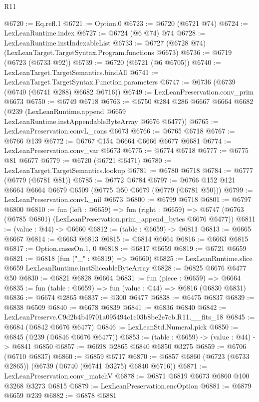 \begin{lexlean}{R11}
\begin{coremodule}
@6720 := Eq.refl.{1}
@6721 := Option.{0}
@6723 := @6720 (@6721 @74)
@6724 := LexLeanRuntime.index
@6727 := @6724 (@6 @74) @74
@6728 := LexLeanRuntime.instIndexableList
@6733 := @6727 (@6728 @74) (LexLeanTarget.TargetSyntax.Program.functions @6673)
@6736 := @6719 (@6723 (@6733 @92))
@6739 := @6720 (@6721 (@6 @6705))
@6740 := LexLeanTarget.TargetSemantics.bindAll
@6741 := LexLeanTarget.TargetSyntax.Function.parameters
@6747 := @6736 (@6739 (@6740 (@6741 @288) @6682 @6716))
@6749 := LexLeanPreservation.conv_prim @6673
@6750 := @6749 @6718
@6763 := @6750
    @284
    @286
    @6667
    @6664
    @6682
    (@239 (LexLeanRuntime.append @6659 LexLeanRuntime.instAppendableByteArray @6676 @6477))
@6765 := LexLeanPreservation.convL_cons @6673
@6766 := @6765 @6718
@6767 := @6766 @139
@6772 := @6767 @154 @6664 @6666 @6677 @6681
@6774 := LexLeanPreservation.conv_var @6673
@6775 := @6774 @6718
@6777 := @6775 @81 @6677
@6779 := @6720 (@6721 @6471)
@6780 := LexLeanTarget.TargetSemantics.lookup
@6781 := @6780 @6718
@6784 := @6777 (@6779 (@6781 @81))
@6785 := @6772 @6784
@6797 := @6766 @152 @121 @6664 @6664 @6679 @6509 (@6775 @50 @6679 (@6779 (@6781 @50)))
@6799 := LexLeanPreservation.convL_nil @6673
@6800 := @6799 @6718
@6801 := @6797 @6800
@6810 := fun (left : @6659) =>
  fun (right : @6659) =>
  @6747 (@6763 (@6785 @6801) (LexLeanPreservation.prim_append_bytes @6676 @6477))
@6811 := (value : @44) -> @6660
@6812 := (table : @6659) -> @6811
@6813 := @6665 @6667
@6814 := @6663 @6813
@6815 := @6814 @6664
@6816 := @6663 @6815
@6817 := Option.casesOn.{1, 0}
@6818 := @6817 @6659
@6819 := @6721 @6659
@6821 := @6818 (fun ("_" : @6819) => @6660)
@6825 := LexLeanRuntime.slice @6659 LexLeanRuntime.instSliceableByteArray
@6828 := @6825 @6676 @6477 @50
@6830 := @6821 @6828 @6664
@6831 := fun (piece : @6659) => @6664
@6835 := fun (table : @6659) => fun (value : @44) => @6816 (@6830 @6831)
@6836 := @6674 @2865
@6837 := @300 @6477
@6838 := @6475 @6837
@6839 := @6838 @6509
@6840 := @6678 @6839
@6841 := @6836 @6840
@6842 := LexLeanPreserve.C9d2b4b49701a095494c1c03b8be2e7cb.R11.__fits_18
@6845 := @6684 (@6842 @6676 @6477)
@6846 := LexLeanStd.Numeral.pick
@6850 := @6845 (@239 (@6846 @6676 @6477))
@6853 := (table : @6659) -> (value : @44) -> @6841 @6850
@6857 := @6698 @2865 @6840 @6850 @3275
@6859 := @6706 (@6710 @6837)
@6860 := @6859 @6717
@6870 := @6857 @6860 (@6723 (@6733 @2865)) (@6739 (@6740 (@6741 @3275) @6840 @6716))
@6871 := LexLeanPreservation.conv_matchV
@6878 := @6871 @6819 @6673 @6860 @100 @3268 @3273 @6815
@6879 := LexLeanPreservation.encOption
@6881 := @6879 @6659 @239
@6882 := @6878 @6881

\end{coremodule}
\end{lexlean}
